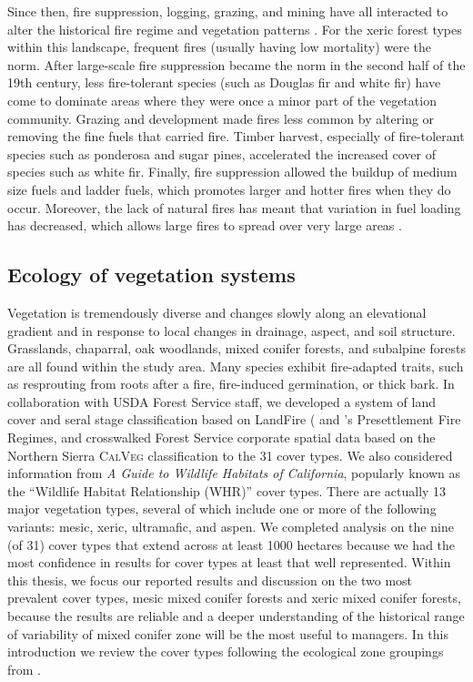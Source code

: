 Since then, fire suppression, logging, grazing, and mining have all interacted to alter the historical fire regime and vegetation patterns \citep{Stephens2015,Knapp2013}. For the xeric forest types within this landscape, frequent fires (usually having low mortality) were the norm. After large-scale fire suppression became the norm in the second half of the 19th century, less fire-tolerant species (such as Douglas fir and white fir) have come to dominate areas where they were once a minor part of the vegetation community. Grazing and development made fires less common by altering or removing the fine fuels that carried fire. Timber harvest, especially of fire-tolerant species such as ponderosa and sugar pines, accelerated the increased cover of species such as white fir. Finally, fire suppression allowed the buildup of medium size fuels and ladder fuels, which promotes larger and hotter fires when they do occur. Moreover, the lack of natural fires has meant that variation in fuel loading has decreased, which allows large fires to spread over very large areas \citep{Hessburg2005,Beaty2007,Meyer2008}.





\subsection{Ecology of vegetation systems}
Vegetation is tremendously diverse and changes slowly along an elevational gradient and in response to local changes in drainage, aspect, and soil structure. Grasslands, chaparral, oak woodlands, mixed conifer forests, and subalpine forests are all found within the study area. Many species exhibit fire-adapted traits, such as resprouting from roots after a fire, fire-induced germination, or thick bark.  In collaboration with USDA Forest Service staff, we developed a system of land cover and seral stage classification based on LandFire ( and \citet{VandeWater2011}'s Presettlement Fire Regimes, and crosswalked Forest Service corporate spatial data based on the Northern Sierra \textsc{CalVeg} classification to the 31 cover types. We also considered information from \emph{A Guide to Wildlife Habitats of California}, popularly known as the ``Wildlife Habitat Relationship (WHR)'' cover types. There are actually 13 major vegetation types, several of which include one or more of the following variants: mesic, xeric, ultramafic, and aspen. We completed analysis on the nine (of 31) cover types that extend across at least 1000 hectares because we had the most confidence in results for cover types at least that well represented. Within this thesis, we focus our reported results and discussion on the two most prevalent cover types, mesic mixed conifer forests and xeric mixed conifer forests, because the results are reliable and a deeper understanding of the historical range of variability of mixed conifer zone will be the most useful to managers. In this introduction we review the cover types following the ecological zone groupings from \citet{VanWag2006}. 

